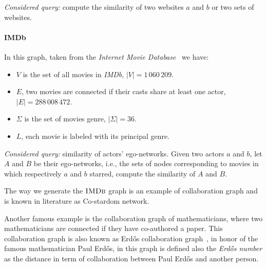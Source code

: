     
    \textsl{Considered query:} compute the similarity of two websites $a$ and $b$ or two sets of websites.
    
    \paragraph*{IMDb} In this graph, taken from the \textit{Internet Movie Database}~\cite{imdb} we have:
    
    \begin{itemize}
    	\item $V$ is the set of all movies in \textit{IMDb},  $|V| = 1\,060\,209$.
		\item $E$, two movies are connected if their casts share at least one actor, $|E| = 288\,008\,472$.
		\item $\Sigma$ is the set of movies genre, $|\Sigma| = 36$.
		\item $L$, each movie is labeled with its principal genre.
    \end{itemize}
    
    
    \textsl{Considered query:} similarity of actors' ego-networks. Given two actors $a$ and $b$, let $A$ and $B$ be their ego-networks, i.e., the sets of nodes corresponding to movies in which respectively $a$ and $b$ starred, compute the similarity of $A$ and $B$.\medskip
    
    
    The way we generate the $\textsc{IMDb}$ graph is an example of collaboration graph and is known in literature as Co-stardom network. 
    
    Another famous example is the collaboration graph of mathematicians, where two mathematicians are connected if they have co-authored a paper. 
    This collaboration graph is also known as Erdős collaboration graph~\cite{BATAGELJ2000173}, in honor of the famous mathematician Paul Erdős, in this graph is defined also the \textit{Erdős number} as the distance in term of collaboration between Paul Erdős and another person.
    
